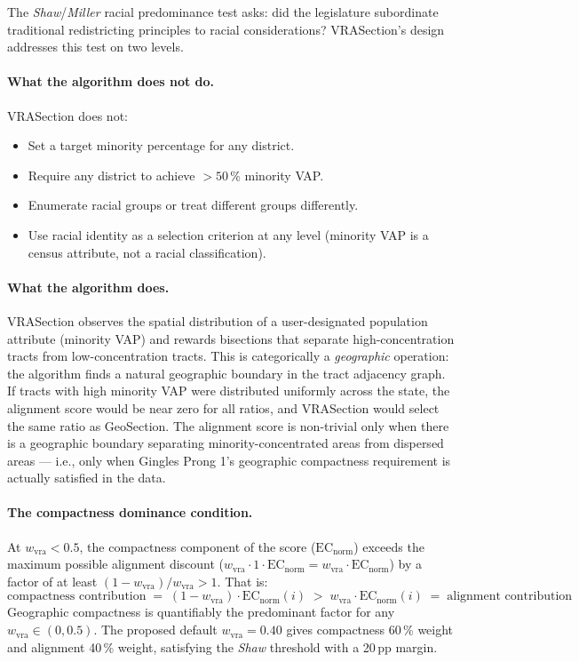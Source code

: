 The \emph{Shaw}/\emph{Miller} racial predominance test asks:
did the legislature subordinate traditional redistricting principles
to racial considerations?
VRASection's design addresses this test on two levels.

\paragraph{What the algorithm does not do.}
VRASection does not:
\begin{itemize}
\item Set a target minority percentage for any district.
\item Require any district to achieve $> 50\,\%$ minority VAP.
\item Enumerate racial groups or treat different groups differently.
\item Use racial identity as a selection criterion at any level
  (minority VAP is a census attribute, not a racial classification).
\end{itemize}

\paragraph{What the algorithm does.}
VRASection observes the spatial distribution of a user-designated
population attribute (minority VAP) and rewards bisections that
separate high-concentration tracts from low-concentration tracts.
This is categorically a \emph{geographic} operation: the algorithm
finds a natural geographic boundary in the tract adjacency graph.
If tracts with high minority VAP were distributed uniformly across
the state, the alignment score would be near zero for all ratios,
and VRASection would select the same ratio as GeoSection.
The alignment score is non-trivial only when there is a geographic
boundary separating minority-concentrated areas from dispersed areas
--- i.e., only when Gingles Prong 1's geographic compactness requirement
is actually satisfied in the data.

\paragraph{The compactness dominance condition.}
At $w_\text{vra} < 0.5$, the compactness component of the score
($\mathrm{EC}_\text{norm}$) exceeds the maximum possible alignment discount
($w_\text{vra} \cdot 1 \cdot \mathrm{EC}_\text{norm} = w_\text{vra} \cdot \mathrm{EC}_\text{norm}$)
by a factor of at least $(1 - w_\text{vra}) / w_\text{vra} > 1$.
That is:
\[
  \text{compactness contribution} \;=\; (1 - w_\text{vra}) \cdot \mathrm{EC}_\text{norm}(i)
  \;>\; w_\text{vra} \cdot \mathrm{EC}_\text{norm}(i) \;=\; \text{alignment contribution}
\]
Geographic compactness is quantifiably the predominant factor for any
$w_\text{vra} \in (0, 0.5)$.
The proposed default $w_\text{vra} = 0.40$ gives compactness 60\,\% weight
and alignment 40\,\% weight, satisfying the \emph{Shaw} threshold with
a 20\,pp margin.

